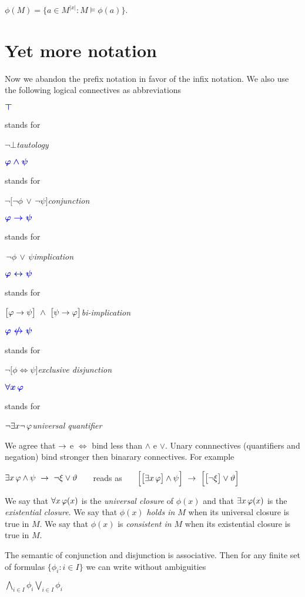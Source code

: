 \hfil$\phi(M)=\big\{a\in M^{|x|}: M\models\phi(a)\big\}$.


\section{Yet more notation}\label{Altriconnettivi}


\def\medrel#1{\parbox[t]{15ex}{\hfil #1}}
\def\ceq#1#2#3{\parbox{20ex}{$\displaystyle #1$}\medrel{#2}$\displaystyle  #3$\hfill}

Now we abandon the prefix notation in favor of the infix notation. We also use the following logical connectives as abbreviations

\ceq{\hfill\emph{$\top$}}{stands for}{\neg\bot}\emph{tautology}

\ceq{\hfill\emph{$\phi\wedge\psi$}}{stands for}{\neg\big[\neg\phi\,\vee\,\neg\psi\big]}\emph{conjunction}

\ceq{\hfill\emph{$\phi\imp\psi$}}{stands for}{\,\neg\phi\,\vee\,\psi}\emph{implication}

\ceq{\hfill\emph{$\phi\iff\psi$}}{stands for}{\big[\phi\imp\psi\big]\ \wedge\ \big[\psi\imp\phi\big]}\emph{bi-implication}

\ceq{\hfill\emph{$\phi\iff\llap{/\kern1.5ex}\psi$}}{stands for}{\neg\big[\phi\iff\psi\big]}\emph{exclusive disjunction}

\ceq{\hfill\emph{$\A x\,\phi$}}{stands for}{\neg\E x\neg\,\phi}\emph{universal quantifier}\bigskip

We agree that $\rightarrow$ e $\iff$ bind less than $\wedge$ e $\vee$.  Unary connnectives (quantifiers and negation) bind stronger then binarary connectives. For example

\hfil$\E x\,\phi \wedge \psi\ \imp\ \neg\xi\vee\theta$ \ \ \ reads as \ \ \ $\Big[\big[\E x\,\phi\big]\wedge\psi\Big]\ \imp\ \Big[\big[\neg\xi\big]\vee\theta\Big]$

We say that $\forall x\,\varphi(x)$ is the \emph{universal closure\/} of $\phi(x)$ and that $\exists x\,\varphi(x)$ is the \emph{existential closure}. We say that $\phi(x)$ \emph{holds in $M$\/} when its universal closure is true in $M$. We say that $\phi(x)$ is \emph{consistent in $M$\/} when its existential closure is true in $M$.

The semantic of conjunction and disjunction is associative. Then for any finite set of formulas $\{\phi_i:i\in I\}$ we can write without ambiguities 

\hfil \emph{$\displaystyle\bigwedge_{i\in I}\phi_i$}\hfil \emph{$\displaystyle\bigvee_{i\in I}\phi_i$}


